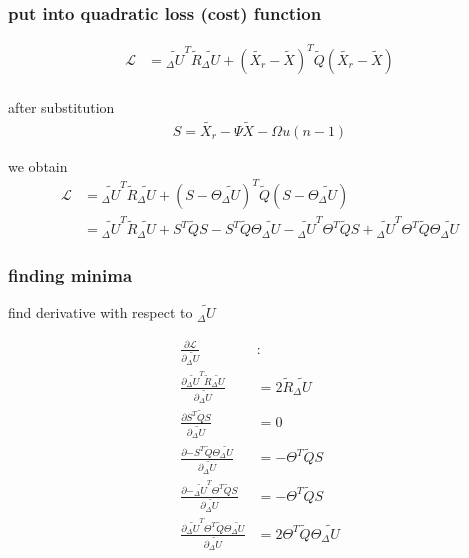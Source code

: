 \documentclass{beamer}
\begin{document}
\begin{frame}
  
  \frametitle{\bf put into quadratic loss (cost) function}

  \begin{align*}
    \mathcal{L} &= \tilde{_\Delta U}^T \tilde{R} \tilde{_\Delta U} 
                + (\tilde{X_r} - \tilde{X})^T \tilde{Q} (\tilde{X_r} - \tilde{X}) \\
  \end{align*}

  after substitution
  \begin{align*}
    S = \tilde{X_r} - \Psi\tilde{X} - \Omega u(n-1)
  \end{align*}

  we obtain
  \begin{align*}
    \mathcal{L} &= \tilde{_\Delta U}^T \tilde{R} \tilde{_\Delta U} + (S -  \Theta \tilde{_\Delta U} )^T \tilde{Q} (S -  \Theta \tilde{_\Delta U} ) \\
                &= \tilde{_\Delta U}^T \tilde{R} \tilde{_\Delta U} 
                + S^T\tilde{Q}S - S^T \tilde{Q} \Theta \tilde{_\Delta U} 
                - \tilde{_\Delta U}^T \Theta^T\tilde{Q}S + \tilde{_\Delta U}^T\Theta^T\tilde{Q}\Theta\tilde{_\Delta U}
  \end{align*}

\end{frame}



\begin{frame}
  
  \frametitle{\bf finding minima}

  find derivative with respect to $\tilde{_\Delta U}$ 

  \begin{align*}  
    \frac{\partial \mathcal{L}}{\partial {\tilde{_\Delta U}}} & : \\
    \frac{\partial {\tilde{_\Delta U}^T \tilde{R} \tilde{_\Delta U} } }{\partial {\tilde{_\Delta U}}} & = 2\tilde{R}\tilde{_\Delta U} \\
    \frac{\partial {S^T\tilde{Q}S}}{\partial {\tilde{_\Delta U}}} & = 0 \\
    \frac{\partial {- S^T \tilde{Q} \Theta \tilde{_\Delta U} }}{\partial {\tilde{_\Delta U}}} & = -\Theta^T\tilde{Q}S \\
    \frac{\partial {- \tilde{_\Delta U}^T \Theta^T\tilde{Q}S}}{\partial {\tilde{_\Delta U}}} & = -\Theta^T\tilde{Q}S \\
    \frac{\partial { \tilde{_\Delta U}^T\Theta^T\tilde{Q}\Theta\tilde{_\Delta U}}}{\partial {\tilde{_\Delta U}}} & = 2\Theta^T\tilde{Q}\Theta\tilde{_\Delta U}
  \end{align*}  

\end{frame}
\end{document}

